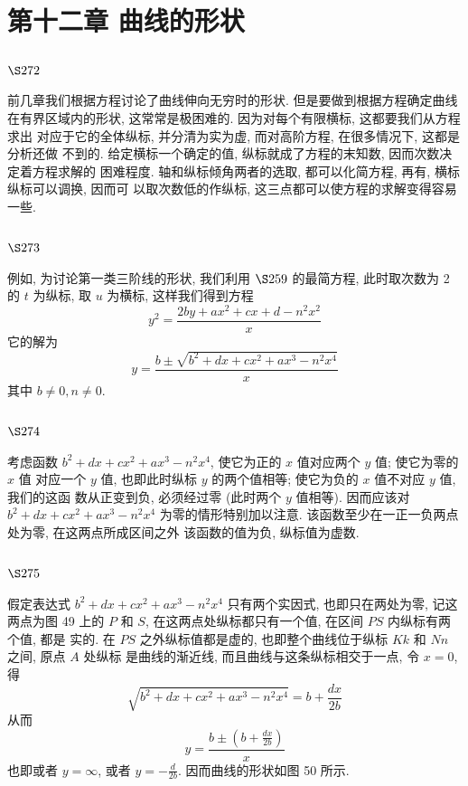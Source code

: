 \chapter{第十二章 曲线的形状}

\section{$\S 272$}

前几章我们根据方程讨论了曲线伸向无穷时的形状. 但是要做到根据方程确定曲线 在有界区域内的形状, 这常常是极困难的. 因为对每个有限横标, 这都要我们从方程求出 对应于它的全体纵标, 并分清为实为虚, 而对高阶方程, 在很多情况下, 这都是分析还做 不到的. 给定横标一个确定的值, 纵标就成了方程的末知数, 因而次数决定着方程求解的 困难程度. 轴和纵标倾角两者的选取, 都可以化简方程, 再有, 横标纵标可以调换, 因而可 以取次数低的作纵标, 这三点都可以使方程的求解变得容易一些.

\section{$\S 273$}

例如, 为讨论第一类三阶线的形状, 我们利用 $\S 259$ 的最简方程, 此时取次数为 2 的 $t$ 为纵标, 取 $u$ 为横标, 这样我们得到方程
\[
y^{2}=\frac{2 b y+a x^{2}+c x+d-n^{2} x^{2}}{x}
\]
它的解为
\[
y=\frac{b \pm \sqrt{b^{2}+d x+c x^{2}+a x^{3}-n^{2} x^{4}}}{x}
\]
其中 $b \neq 0, n \neq 0$.

\section{$\S 274$}

考虑函数 $b^{2}+d x+c x^{2}+a x^{3}-n^{2} x^{4}$, 使它为正的 $x$ 值对应两个 $y$ 值; 使它为零的 $x$ 值 对应一个 $y$ 值, 也即此时纵标 $y$ 的两个值相等; 使它为负的 $x$ 值不对应 $y$ 值, 我们的这函 数从正变到负, 必须经过零 (此时两个 $y$ 值相等). 因而应该对 $b^{2}+d x+c x^{2}+a x^{3}-n^{2} x^{4}$ 为零的情形特别加以注意. 该函数至少在一正一负两点处为零, 在这两点所成区间之外 该函数的值为负, 纵标值为虚数. 

\section{$\S 275$}

假定表达式 $b^2+d x+c x^2+a x^3-n^2 x^4$ 只有两个实因式, 也即只在两处为零, 记这两点为图 49 上的 $P$ 和 $S$, 在这两点处纵标都只有一个值, 在区间 $P S$ 内纵标有两个值, 都是 实的. 在 $P S$ 之外纵标值都是虚的, 也即整个曲线位于纵标 $K k$ 和 $N n$ 之间, 原点 $A$ 处纵标 是曲线的渐近线, 而且曲线与这条纵标相交于一点, 令 $x=0$, 得
\[
\sqrt{b^{2}+d x+c x^{2}+a x^{3}-n^{2} x^{4}}=b+\frac{d x}{2 b}
\]
从而
\[
y=\frac{b \pm\left(b+\frac{d x}{2 b}\right)}{x}
\]
也即或者 $y=\infty$, 或者 $y=-\frac{d}{2 b}$. 因而曲线的形状如图 50 所示.



